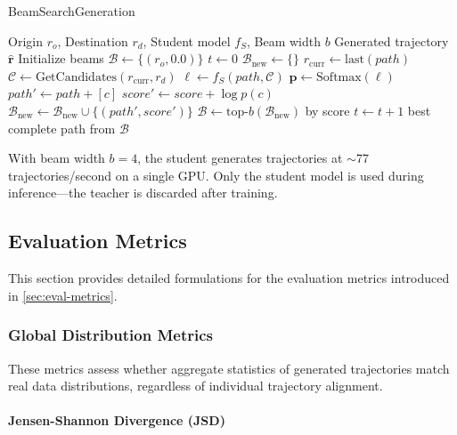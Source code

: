 \begin{algorithm}[H]
\caption{BeamSearchGeneration}
\label{alg:beam-search-appendix}
\begin{algorithmic}
\Require Origin $r_o$, Destination $r_d$, Student model $f_S$, Beam width $b$
\Ensure Generated trajectory $\hat{\mathbf{r}}$
\State Initialize beams $\mathcal{B} \gets \{(r_o, 0.0)\}$ 
\State $t \gets 0$
    \State $\mathcal{B}_{\text{new}} \gets \{\}$
        \State $r_{\text{curr}} \gets \text{last}(path)$
        \State $\mathcal{C} \gets \text{GetCandidates}(r_{\text{curr}}, r_d)$ 
        \State $\mathbf{\ell} \gets f_S(path, \mathcal{C})$ 
        \State $\mathbf{p} \gets \text{Softmax}(\mathbf{\ell})$
            \State $path' \gets path + [c]$
            \State $score' \gets score + \log p(c)$
            \State $\mathcal{B}_{\text{new}} \gets \mathcal{B}_{\text{new}} \cup \{(path', score')\}$
        \EndFor
    \EndFor
    \State $\mathcal{B} \gets \text{top-}b(\mathcal{B}_{\text{new}})$ by score
    \State $t \gets t + 1$
\EndWhile
\State \Return best complete path from $\mathcal{B}$
\end{algorithmic}
\end{algorithm}

With beam width $b=4$, the student generates trajectories at $\sim$77 trajectories/second on a single GPU. Only the student model is used during inference---the teacher is discarded after training.

\subsection{Evaluation Metrics}
\label{app:metrics}

This section provides detailed formulations for the evaluation metrics introduced in \autoref{sec:eval-metrics}.

\subsubsection{Global Distribution Metrics}
\label{app:global-metrics}

These metrics assess whether aggregate statistics of generated trajectories match real data distributions, regardless of individual trajectory alignment.

\paragraph{Jensen-Shannon Divergence (JSD)}

